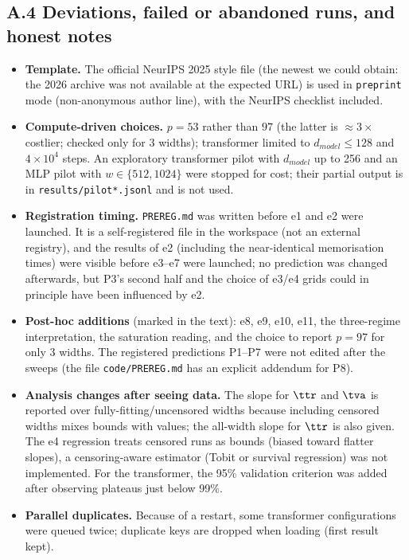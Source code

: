 \subsection*{A.4 Deviations, failed or abandoned runs, and honest notes}
\begin{itemize}\setlength\itemsep{0pt}
\item \textbf{Template.} The official NeurIPS 2025 style file (the newest we could obtain: the 2026 archive was not available at the expected URL) is used in \texttt{preprint} mode (non-anonymous author line), with the NeurIPS checklist included.
\item \textbf{Compute-driven choices.} $p{=}53$ rather than $97$ (the latter is $\approx3\times$ costlier; checked only for 3 widths); transformer limited to $d_{model}\le128$ and $4\times10^4$ steps. An exploratory transformer pilot with $d_{model}$ up to 256 and an MLP pilot with $w\in\{512,1024\}$ were stopped for cost; their partial output is in \texttt{results/pilot*.jsonl} and is not used.
\item \textbf{Registration timing.} \texttt{PREREG.md} was written before e1 and e2 were launched. It is a self-registered file in the workspace (not an external registry), and the results of e2 (including the near-identical memorisation times) were visible before e3--e7 were launched; no prediction was changed afterwards, but P3's second half and the choice of e3/e4 grids could in principle have been influenced by e2.
\item \textbf{Post-hoc additions} (marked in the text): e8, e9, e10, e11, the three-regime interpretation, the saturation reading, and the choice to report $p{=}97$ for only 3 widths. The registered predictions P1--P7 were not edited after the sweeps (the file \texttt{code/PREREG.md} has an explicit addendum for P8).
\item \textbf{Analysis changes after seeing data.} The slope for $\ttr$ and $\tva$ is reported over fully-fitting/uncensored widths because including censored widths mixes bounds with values; the all-width slope for $\ttr$ is also given. The e4 regression treats censored runs as bounds (biased toward flatter slopes), a censoring-aware estimator (Tobit or survival regression) was not implemented. For the transformer, the 95\% validation criterion was added after observing plateaus just below 99\%.
\item \textbf{Parallel duplicates.} Because of a restart, some transformer configurations were queued twice; duplicate keys are dropped when loading (first result kept).

\end{itemize}
